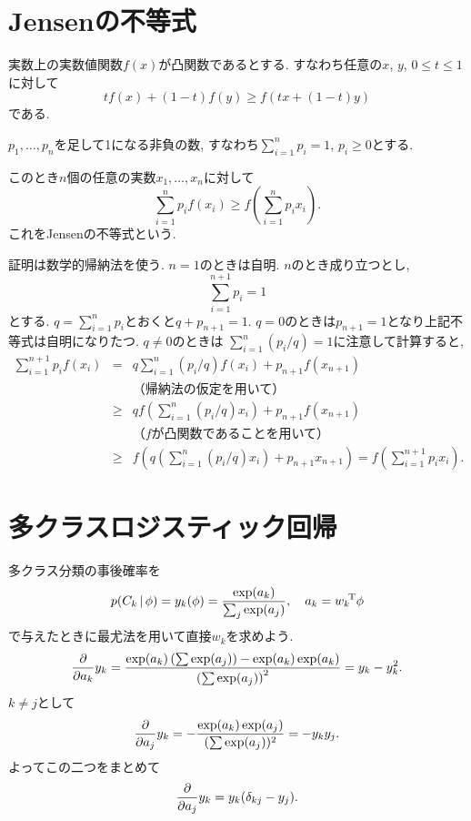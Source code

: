 \section{Jensenの不等式}
実数上の実数値関数$f(x)$が凸関数であるとする.
すなわち任意の$x$, $y$, $0 \le t \le 1$に対して
$$
tf(x) + (1-t)f(y) \ge f(tx+(1-t)y)
$$
である.

$p_1, \ldots, p_n$を足して1になる非負の数, すなわち$\sum_{i=1}^n p_i=1$, $p_i \ge 0$とする.

このとき$n$個の任意の実数$x_1, \ldots, x_n$に対して
$$
\sum_{i=1}^n p_i f(x_i) \ge f\left(\sum_{i=1}^n p_i x_i\right).
$$
これをJensenの不等式という.

証明は数学的帰納法を使う.
$n=1$のときは自明. $n$のとき成り立つとし,
$$
\sum_{i=1}^{n+1} p_i=1
$$
とする.
$q=\sum_{i=1}^n p_i$とおくと$q + p_{n+1}=1$.
$q=0$のときは$p_{n+1}=1$となり上記不等式は自明になりたつ.
\pagebreak
$q \ne 0$のときは
$
\sum_{i=1}^n (p_i/q) = 1
$に注意して計算すると,
\begin{eqnarray*}
\sum_{i=1}^{n+1} p_i f(x_i) &=& q \sum_{i=1}^n (p_i/q) f(x_i) + p_{n+1} f(x_{n+1})\\
 &&\text{（帰納法の仮定を用いて）}\\
 &\ge& q f\left(\sum_{i=1}^n (p_i/q) x_i\right) + p_{n+1} f(x_{n+1})\\
 &&\text{（$f$が凸関数であることを用いて）}\\
 &\ge& f\left(q \left(\sum_{i=1}^n (p_i/q) x_i\right) + p_{n+1}x_{n+1}\right)
 = f\left(\sum_{i=1}^{n+1} p_i x_i\right).
\end{eqnarray*}
\vspace{0pt}

\section{多クラスロジスティック回帰}\label{takurasu}
多クラス分類の事後確率を
$$
p(C_k\,|\,\phi)=y_k(\phi)=\frac{\exp(a_k)}{\sum_j \exp(a_j)},
\quad a_k={w_k}^{\!\mathrm{T}}\phi
$$
で与えたときに最尤法を用いて直接$w_k$を求めよう.
$$
\frac{\partial}{\partial a_k}y_k=\frac{\exp(a_k)\left(\sum \exp(a_j)\right)-\exp(a_k)\exp(a_k)}{\left(\sum \exp(a_j)\right)^2}=y_k-y_k^2.
$$
$k\ne j$として
$$
\frac{\partial}{\partial a_j}y_k=-\frac{\exp(a_k) \exp(a_j)}{(\sum \exp(a_j))^2}=-y_k y_j.
$$
よってこの二つをまとめて
\begin{eqnarray}\label{ch4_mclass}
\frac{\partial}{\partial a_j}y_k=y_k(\delta_{kj}-y_j).
\end{eqnarray}

